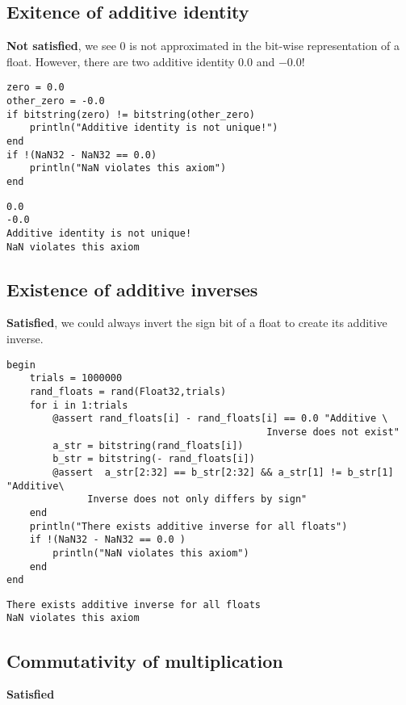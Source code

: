 \documentclass[11pt]{article}
\begin{document}
\subsection{Exitence of additive identity}
\label{sec:org4c3141a}

\textbf{Not satisfied}, we see \(0\) is not approximated in the bit-wise representation
 of a float. However, there are two additive identity \(0.0\) and \(-0.0\)!
\begin{verbatim}
zero = 0.0
other_zero = -0.0
if bitstring(zero) != bitstring(other_zero)
    println("Additive identity is not unique!")
end
if !(NaN32 - NaN32 == 0.0)
    println("NaN violates this axiom")
end
\end{verbatim}

\begin{verbatim}
0.0
-0.0
Additive identity is not unique!
NaN violates this axiom
\end{verbatim}

\subsection{Existence of additive inverses}
\label{sec:org1d1662e}
\textbf{Satisfied}, we could always invert the sign bit of a float to create its
 additive inverse.

\begin{verbatim}
begin
    trials = 1000000
    rand_floats = rand(Float32,trials)
    for i in 1:trials
        @assert rand_floats[i] - rand_floats[i] == 0.0 "Additive \
                                             Inverse does not exist"
        a_str = bitstring(rand_floats[i])
        b_str = bitstring(- rand_floats[i])
        @assert  a_str[2:32] == b_str[2:32] && a_str[1] != b_str[1] "Additive\
              Inverse does not only differs by sign"
    end
    println("There exists additive inverse for all floats")
    if !(NaN32 - NaN32 == 0.0 )
        println("NaN violates this axiom")
    end
end
\end{verbatim}

\begin{verbatim}
There exists additive inverse for all floats
NaN violates this axiom
\end{verbatim}

\subsection{Commutativity of multiplication}
\label{sec:org66e6fb9}
\textbf{Satisfied}
\end{document}
